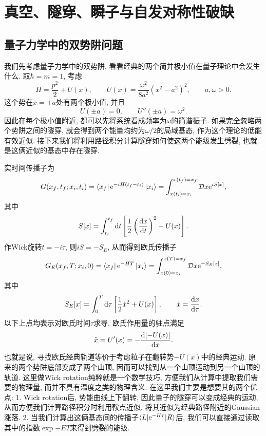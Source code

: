 \section{真空、隧穿、瞬子与自发对称性破缺}
\subsection{量子力学中的双势阱问题}
我们先考虑量子力学中的双势阱, 看看经典的两个简并极小值在量子理论中会发生什么. 取$\hbar=m=1$, 考虑
\begin{equation}
    H=\frac{p^2}{2}+U(x),\qquad
    U(x)=\frac{\omega^2}{8a^2}(x^2-a^2)^2,\qquad a,\omega>0.
\end{equation}
这个势在$x=\pm a$处有两个极小值, 并且
\begin{equation}
    U(\pm a)=0,\qquad U''(\pm a)=\omega^2.
\end{equation}
因此在每个极小值附近, 都可以先将系统看成频率为$\omega$的简谐振子. 如果完全忽略两个势阱之间的隧穿, 就会得到两个能量均约为$\omega/2$的局域基态, 作为这个理论的低能有效近似. 接下来我们将利用路径积分计算隧穿如何使这两个能级发生劈裂, 也就是这俩近似的基态中存在隧穿.

实时间传播子为
\begin{equation}
    G(x_f,t_f;x_i,t_i)
    =\bra{x_f}\mathrm e^{-iH(t_f-t_i)}\ket{x_i}
    =\int_{x(t_i)=x_i}^{x(t_f)=x_f}\mathcal Dx\mathrm e^{iS[x]},
\end{equation}
其中
\begin{equation}
    S[x]=\int_{t_i}^{t_f}\mathrm d t\left[\frac12\left(\frac{\mathrm d x}{\mathrm d t}\right)^2-U(x)\right].
\end{equation}
作Wick旋转$t=-i\tau$, 则$iS=-S_E$, 从而得到欧氏传播子
\begin{equation}\label{ssb-euclidean-kernel}
    G_E(x_f,T;x_i,0)
    =\bra{x_f}\mathrm e^{-HT}\ket{x_i}
    =\int_{x(0)=x_i}^{x(T)=x_f}\mathcal Dx\mathrm e^{-S_E[x]},
\end{equation}
其中
\begin{equation}
    S_E[x]=\int_0^T\mathrm d\tau\left[\frac12\dot x^2+U(x)\right],
    \qquad \dot x=\frac{\mathrm d x}{\mathrm d\tau}.
\end{equation}
以下上点均表示对欧氏时间$\tau$求导. 欧氏作用量的驻点满足
\begin{equation}
    \ddot x=U'(x)=-\frac{\mathrm d[-U(x)]}{\mathrm d x}.
\end{equation}
也就是说, 寻找欧氏经典轨道等价于考虑粒子在翻转势$-U(x)$中的经典运动. 原来的两个势阱底部变成了两个山顶, 因而可以找到从一个山顶运动到另一个山顶的轨道. 这里做Wick rotation纯粹就是一个数学技巧, 方便我们从计算中提取我们需要的物理量, 而并不具有温度之类的物理含义. 在这里我们主要是想要其的两个优点: 1. Wick rotation后, 势能曲线上下翻转, 因此量子的隧穿可以变成经典的运动, 从而方便我们计算路径积分时利用鞍点近似, 将其近似为经典路径附近的Gaussian涨落. 2. 当我们计算出这俩基态间的传播子$\braket{L|\mathrm e^{-H\tau}|R}$后, 我们可以直接通过读取其中的指数$\exp{-ET}$来得到劈裂的能级.

